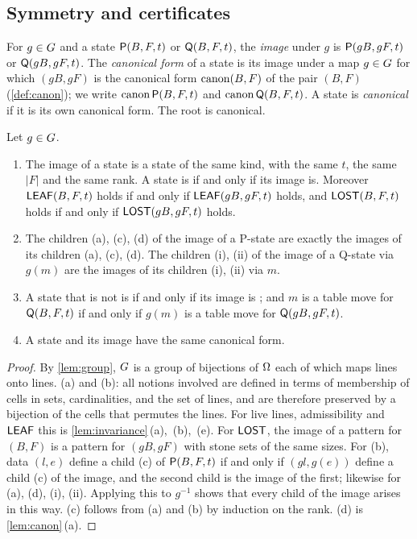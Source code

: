 \subsection{Symmetry and certificates}\label{sec:cert}

For $g\in G$ and a state $\mathsf{P}(B,F,t)$ or $\mathsf{Q}(B,F,t)$, the \emph{image} under $g$ is $\mathsf{P}(gB,gF,t)$ or
$\mathsf{Q}(gB,gF,t)$. The \emph{canonical form} of a state is its image under a map $g\in G$ for which
$(gB,gF)$ is the canonical form $\operatorname{canon}(B,F)$ of the pair $(B,F)$ (\cref{def:canon}); we
write $\operatorname{canon}\mathsf{P}(B,F,t)$ and $\operatorname{canon}\mathsf{Q}(B,F,t)$. A state is \emph{canonical} if it is its own canonical
form. The root is canonical.

\begin{lemma}\label{lem:game-invariance}
Let $g\in G$.
\begin{enumerate}[label=\textup{(\alph*)},leftmargin=2.4em]
\item The image of a state is a state of the same kind, with the same $t$, the same $|F|$ and the same rank.
  A state is \VOID{} if and only if its image is. Moreover $\mathsf{LEAF}(B,F,t)$ holds if and only if
  $\mathsf{LEAF}(gB,gF,t)$ holds, and $\mathsf{LOST}(B,F,t)$ holds if and only if $\mathsf{LOST}(gB,gF,t)$ holds.
\item The children \textup{(a)}, \textup{(c)}, \textup{(d)} of the image of a P-state are exactly the images
  of its children \textup{(a)}, \textup{(c)}, \textup{(d)}. The children \textup{(i)}, \textup{(ii)} of the
  image of a Q-state via $g(m)$ are the images of its children \textup{(i)}, \textup{(ii)} via $m$.
\item A state that is not \VOID{} is \WON{} if and only if its image is \WON; and $m$ is a table move for
  $\mathsf{Q}(B,F,t)$ if and only if $g(m)$ is a table move for $\mathsf{Q}(gB,gF,t)$.
\item A state and its image have the same canonical form.
\end{enumerate}
\end{lemma}

\begin{proof}
By \cref{lem:group}, $G$ is a group of bijections of $\Omega$ each of which maps lines onto lines.
(a) and (b): all notions involved are defined in terms of membership of cells in sets, cardinalities, and
the set of lines, and are therefore preserved by a bijection of the cells that permutes the lines. For live
lines, admissibility and $\mathsf{LEAF}$ this is \cref{lem:invariance}\,(a),~(b),~(e). For $\mathsf{LOST}$, the image of a pattern for
$(B,F)$ is a pattern for $(gB,gF)$ with stone sets of the same sizes. For (b), data $(l,e)$ define a
child \textup{(c)} of $\mathsf{P}(B,F,t)$ if and only if $(gl,g(e))$ define a child \textup{(c)} of the image, and
the second child is the image of the first; likewise for \textup{(a)}, \textup{(d)}, \textup{(i)},
\textup{(ii)}. Applying this to $g^{-1}$ shows that every child of the image arises in this way.
(c) follows from (a) and (b) by induction on the rank. (d) is \cref{lem:canon}\,(a).
\end{proof}

